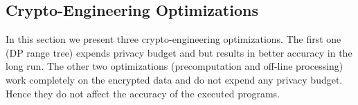 \begin{comment}
For answering queries of the form $\phi=A_1==v_1\wedge \ldots  \wedge A_n==v_n$, ideally we just need to compute for $A_2==v_2\wedge \ldots \wedge A_n==v_n$ on $ct_{A,v}$ number of records starting from position $\sum_{i=1}^{i=v-1}ct_{A,i}$ of $\boldsymbol{\mathcal{\tilde{D}}}_{sort}$. 

However the \textsf{AS} has access only to the noisy CDF over the $k$ bins $ct_{A,i}$. Note that when $\bar{i}_{start}=\bar{\hat{\mathcal{C}}}[v-1] < \sum_{i=1}^{i=v-1}ct_{A,i}$ and $\bar{i}_{end}= \bar{\hat{\mathcal{C}}}[v-1] > i_{start}+ct_{A,v}$, i.e., the indices computed from the noisy values  saddle over the true records satisfying $A==v$, then although we end up loosing in performance a bit, we are still guaranteed to compute the exact non-noisy count for records satisfying $\phi$. 

In all other cases, we end up disregarding some of the records that satisfy $A==v$, some of these rejected records in fact might additionally satisfy $A_1==v_1 \wedge \ldots \wedge A_n==v_n$. Thus we might get inaccurate answer for query predicate $\phi$ (note that here we are talking about the encrypted true count of the given query predicate that is computed by the AS via a series of transformations before applying the LaplaceMechanism primitive).  An effective heuristic to tackle this can be to compensate for the expected laplacian error as follows  $\bar{i}_{start}= \bar{\hat{\mathcal{C}}}[v-1]-\frac{2}{\epsilon}$ and $\bar{i}_{end}=\bar{\hat{\mathcal{C}}}[v]+\frac{2}{\epsilon}$. Also note that answering differentially private  range queries   on attribute $A$ can also be directly done from the noisy CDF $\bar{\hat{\mathcal{C}}}$ 
\end{comment}
\vspace{-0.3cm}\subsection{Crypto-Engineering Optimizations} \label{sec:im_optimization}
In this section we present three crypto-engineering optimizations. The first one (DP range tree) expends privacy budget and but results in better accuracy in the long run. The other two optimizations (precomputation and off-line processing) work completely on the encrypted data and do not expend any privacy budget. Hence they do not affect the accuracy of the executed programs.






